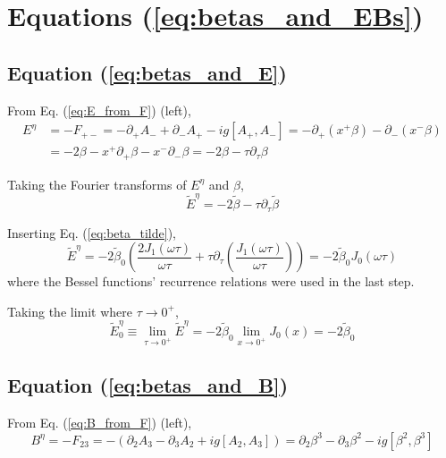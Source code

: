 \section{Equations (\ref{eq:betas_and_EBs})}
\label{ap:betas_and_EBs}
\subsection{Equation (\ref{eq:betas_and_E})}
From Eq. (\ref{eq:E_from_F}) (left), 
\begin{equation}
\begin{split}
	E^\eta & = -F_{+-} = -\partial_+ A_- + \partial_- A_+ - ig \left[A_+,A_- \right] = -\partial_+ (x^+ \beta) - \partial_- (x^- \beta) \\
	& = -2\beta - x^+ \partial_+ \beta - x^- \partial_-  \beta = -2\beta -\tau \partial_\tau \beta 
\end{split}
\label{eq:E_eta_from_beta}
\end{equation}

Taking the Fourier transforms of $E^\eta$ and $\beta$,
\begin{equation}
	\tilde{E}^\eta = -2\tilde{\beta} -\tau \partial_\tau \tilde{\beta}
\end{equation}

Inserting Eq. (\ref{eq:beta_tilde}),
\begin{equation}
	\tilde{E}^\eta = -2 \tilde{\beta}_0  \left(\frac{2J_1(\omega \tau)}{\omega \tau} + \tau \partial_\tau \left(\frac{J_1(\omega \tau)}{\omega \tau}   \right) \right) = -2 \tilde{\beta}_0 J_0(\omega \tau)
\end{equation}
where the Bessel functions' recurrence relations were used in the last step.

Taking the limit where $\tau \to 0^+$,
\begin{equation}
	\tilde{E}^\eta_0  \equiv \lim_{\tau \to 0^+} \tilde{E}^\eta =  -2 \tilde{\beta}_0 \lim_{x \to 0^+}  J_0(x) = -2 \tilde{\beta}_0
\end{equation}


\subsection{Equation (\ref{eq:betas_and_B})}
From Eq. (\ref{eq:B_from_F}) (left),
\begin{equation}
	B^\eta = - F_{23} = - \left( \partial_2 A_3 - \partial_3 A_2 + ig[A_2,A_3] \right) =  \partial_2 \beta^3 - \partial_3 \beta^2 - ig[\beta^2,\beta^3]
	\label{eq:B_eta_from_beta}
\end{equation}

